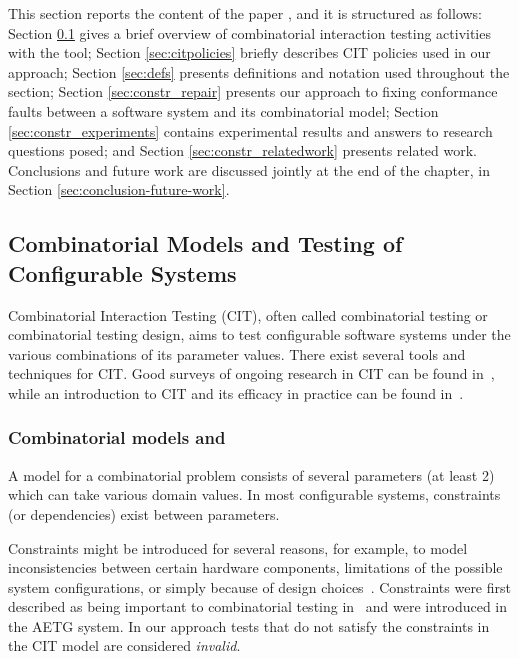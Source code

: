 \begin{tikzborder}{\cite{Gargantini16:validation}}
This section reports the content of the paper \cite{gargantini_combinatorial_2017}, and it is structured as follows: Section \ref{sec:citmodels} gives a brief overview of combinatorial interaction testing activities with the \citlab tool; Section \ref{sec:citpolicies} briefly describes CIT policies used in our approach; Section \ref{sec:defs} presents definitions and notation used throughout the section; Section \ref{sec:constr_repair} presents our approach to fixing conformance faults between a software system and its combinatorial model; Section \ref{sec:constr_experiments} contains experimental results and answers to research questions posed; and Section \ref{sec:constr_relatedwork} presents related work. Conclusions and future work are discussed jointly at the end of the chapter, in Section \ref{sec:conclusion-future-work}.

\subsection{Combinatorial Models and Testing of Configurable Systems}
\label{sec:citmodels}

\begin{tikzborder}{\cite{gargantini_combinatorial_2017}}
Combinatorial Interaction Testing (CIT), often called combinatorial
testing or combinatorial testing design, aims to test 
configurable software systems under the various combinations of its parameter values. 
There exist several tools and techniques for CIT. Good surveys of ongoing research in CIT can be found in~\cite{GrindalSTVR05,NieL11},
while an introduction to CIT and its efficacy in practice can be found
in~\cite{kuhncomputer09,Petke15:practical}. \be

\subsubsection{Combinatorial models and \citlab{}\label{sec:citAndCitlab}}

\bb A model for a combinatorial problem
consists of several parameters (at least 2) which can take various domain values. 
In most configurable systems, constraints (or dependencies)
exist between parameters. 

Constraints might be introduced for several
reasons, for example, to model inconsistencies between certain hardware
components, limitations of the possible system configurations, or
simply because of design choices~\cite{CohenISSTA07}. Constraints were first
described as being important to combinatorial testing in~\cite{AETG}
and were introduced in the AETG system. In our approach tests that
do not satisfy the constraints in the CIT model are considered \emph{invalid}.


\end{tikzborder}
\end{tikzborder}
